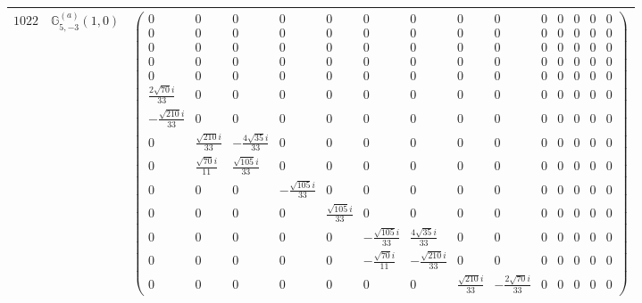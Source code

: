 \documentclass[fleqn,8pt,landscape]{jsarticle}
\begin{document}
\begin{center}
\begin{longtable}{ccc}
$ 1022 $ & $ \mathbb{G}_{5,-3}^{(a)}(1,0) $ & $ \begin{pmatrix} 0 & 0 & 0 & 0 & 0 & 0 & 0 & 0 & 0 & 0 & 0 & 0 & 0 & 0 \\ 0 & 0 & 0 & 0 & 0 & 0 & 0 & 0 & 0 & 0 & 0 & 0 & 0 & 0 \\ 0 & 0 & 0 & 0 & 0 & 0 & 0 & 0 & 0 & 0 & 0 & 0 & 0 & 0 \\ 0 & 0 & 0 & 0 & 0 & 0 & 0 & 0 & 0 & 0 & 0 & 0 & 0 & 0 \\ 0 & 0 & 0 & 0 & 0 & 0 & 0 & 0 & 0 & 0 & 0 & 0 & 0 & 0 \\ \frac{2 \sqrt{70} i}{33} & 0 & 0 & 0 & 0 & 0 & 0 & 0 & 0 & 0 & 0 & 0 & 0 & 0 \\ - \frac{\sqrt{210} i}{33} & 0 & 0 & 0 & 0 & 0 & 0 & 0 & 0 & 0 & 0 & 0 & 0 & 0 \\ 0 & \frac{\sqrt{210} i}{33} & - \frac{4 \sqrt{35} i}{33} & 0 & 0 & 0 & 0 & 0 & 0 & 0 & 0 & 0 & 0 & 0 \\ 0 & \frac{\sqrt{70} i}{11} & \frac{\sqrt{105} i}{33} & 0 & 0 & 0 & 0 & 0 & 0 & 0 & 0 & 0 & 0 & 0 \\ 0 & 0 & 0 & - \frac{\sqrt{105} i}{33} & 0 & 0 & 0 & 0 & 0 & 0 & 0 & 0 & 0 & 0 \\ 0 & 0 & 0 & 0 & \frac{\sqrt{105} i}{33} & 0 & 0 & 0 & 0 & 0 & 0 & 0 & 0 & 0 \\ 0 & 0 & 0 & 0 & 0 & - \frac{\sqrt{105} i}{33} & \frac{4 \sqrt{35} i}{33} & 0 & 0 & 0 & 0 & 0 & 0 & 0 \\ 0 & 0 & 0 & 0 & 0 & - \frac{\sqrt{70} i}{11} & - \frac{\sqrt{210} i}{33} & 0 & 0 & 0 & 0 & 0 & 0 & 0 \\ 0 & 0 & 0 & 0 & 0 & 0 & 0 & \frac{\sqrt{210} i}{33} & - \frac{2 \sqrt{70} i}{33} & 0 & 0 & 0 & 0 & 0 \end{pmatrix} $ \\ \hline

\end{longtable}
\end{center}
\end{document}
